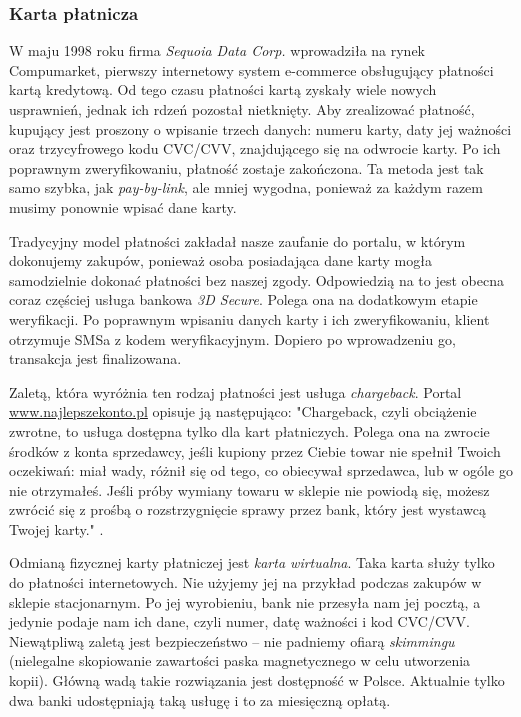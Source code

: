 \documentclass[12pt]{article}
\numberwithin{figure}{section}
\begin{document}
\begin{sloppypar}
\subsubsection{Karta płatnicza} \label{sec:cards}
W maju 1998 roku firma \textit{Sequoia Data Corp.} wprowadziła na rynek Compumarket, pierwszy internetowy system e-commerce obsługujący płatności kartą kredytową. Od tego czasu płatności kartą zyskały wiele nowych usprawnień, jednak ich rdzeń pozostał nietknięty. Aby zrealizować płatność, kupujący jest proszony o wpisanie trzech danych: numeru karty, daty jej ważności oraz trzycyfrowego kodu CVC/CVV, znajdującego się na odwrocie karty. Po ich poprawnym zweryfikowaniu, płatność zostaje zakończona. Ta metoda jest tak samo szybka, jak \textit{pay-by-link}, ale mniej wygodna, ponieważ za każdym razem musimy ponownie wpisać dane karty. 

Tradycyjny model płatności zakładał nasze zaufanie do portalu, w którym dokonujemy zakupów, ponieważ osoba posiadająca dane karty mogła samodzielnie dokonać płatności bez naszej zgody. Odpowiedzią na to jest obecna coraz częściej usługa bankowa \textit{3D Secure}. Polega ona na dodatkowym etapie weryfikacji. Po poprawnym wpisaniu danych karty i ich zweryfikowaniu, klient otrzymuje SMSa z kodem weryfikacyjnym. Dopiero po wprowadzeniu go, transakcja jest finalizowana.

Zaletą, która wyróżnia ten rodzaj płatności jest usługa \textit{chargeback}. Portal \url{www.najlepszekonto.pl} opisuje ją następująco: "Chargeback, czyli obciążenie zwrotne, to usługa dostępna tylko dla kart płatniczych. Polega ona na zwrocie środków z konta sprzedawcy, jeśli kupiony przez Ciebie towar nie spełnił Twoich oczekiwań: miał wady, różnił się od tego, co obiecywał sprzedawca, lub w ogóle go nie otrzymałeś. Jeśli próby wymiany towaru w sklepie nie powiodą się, możesz zwrócić się z prośbą o rozstrzygnięcie sprawy przez bank, który jest wystawcą Twojej karty." \cite{chargeback}.

Odmianą fizycznej karty płatniczej jest \textit{karta wirtualna}. Taka karta służy tylko do płatności internetowych. Nie użyjemy jej na przykład podczas zakupów w sklepie stacjonarnym. Po jej wyrobieniu, bank nie przesyła nam jej pocztą, a jedynie podaje nam ich dane, czyli numer, datę ważności i kod CVC/CVV. Niewątpliwą zaletą jest bezpieczeństwo -- nie padniemy ofiarą \textit{skimmingu} (nielegalne skopiowanie zawartości paska magnetycznego w celu utworzenia kopii). Główną wadą takie rozwiązania jest dostępność w Polsce. Aktualnie tylko dwa banki udostępniają taką usługę i to za miesięczną opłatą. 


\end{sloppypar}
\end{document}
